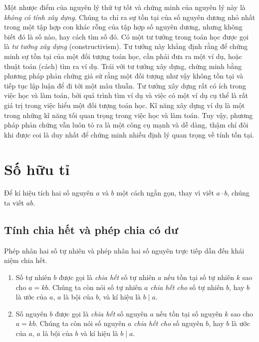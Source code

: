 Một nhược điểm của nguyên lý thứ tự tốt và chứng minh của nguyên lý này là \textit{không có tính xây dựng}. Chúng ta chỉ ra sự tồn tại của số nguyên dương nhỏ nhất trong một tập hợp con khác rỗng của tập hợp số nguyên dương, nhưng không biết đó là số nào, hay cách tìm số đó. Có một tư tưởng trong toán học được gọi là \textit{tư tưởng xây dựng} (constructivism). Tư tưởng này khẳng định rằng để chứng minh sự tồn tại của một đối tượng toán học, cần phải đưa ra một ví dụ, hoặc thuật toán (cách) tìm ra ví dụ. Trái với tư tưởng xây dựng, chứng minh bằng phương pháp phản chứng giả sử rằng một đối tượng như vậy không tồn tại và tiếp tục lập luận để đi tới một mâu thuẫn. Tư tưởng xây dựng rất có ích trong việc học và làm toán, bởi quá trình tìm ví dụ và việc có một ví dụ cụ thể là rất giá trị trong việc hiểu một đối tượng toán học. Kĩ năng xây dựng ví dụ là một trong những kĩ năng tối quan trọng trong việc học và làm toán. Tuy vậy, phương pháp phản chứng vẫn luôn tỏ ra là một công cụ mạnh và dễ dàng, thậm chí đôi khi được coi là duy nhất để chứng minh nhiều định lý quan trọng về tính tồn tại.

\section{Số hữu tỉ}\label{section:rationals}

Để kí hiệu tích hai số nguyên $a$ và $b$ một cách ngắn gọn, thay vì viết $a\cdot b$, chúng ta viết $ab$.

\subsection{Tính chia hết và phép chia có dư}

Phép nhân hai số tự nhiên và phép nhân hai số nguyên trực tiếp dẫn đến khái niệm chia hết.

\begin{definition}
    \begin{enumerate}[label={(\roman*)}]
        \item Số tự nhiên $b$ được gọi là \textit{chia hết} số tự nhiên $a$ nếu tồn tại số tự nhiên $k$ sao cho $a = kb$. Chúng ta còn nói số tự nhiên $a$ \textit{chia hết cho} số tự nhiên $b$, hay $b$ là ước của $a$, $a$ là bội của $b$, và kí hiệu là $b\mid a$.
        \item Số nguyên $b$ được gọi là \textit{chia hết} số nguyên $a$ nếu tồn tại số nguyên $k$ sao cho $a = kb$. Chúng ta còn nói số nguyên $a$ \textit{chia hết cho} số nguyên $b$, hay $b$ là ước của $a$, $a$ là bội của $b$ và kí hiệu là $b\mid a$.
    \end{enumerate}
\end{definition}

